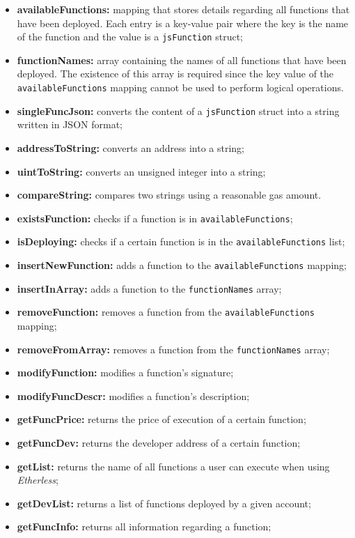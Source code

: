 	\begin{itemize}
		\item \textbf{availableFunctions:} mapping that stores details regarding all functions that have been deployed. Each entry is a key-value pair where the key is the name of the function and the value is a \texttt{jsFunction} struct;
		\item \textbf{functionNames:} array containing the names of all functions that have been deployed. The existence of this array is required since the key value of the \texttt{availableFunctions} mapping cannot be used to perform logical operations.
	\end{itemize}
	\begin{itemize}
		\item \textbf{singleFuncJson:} converts the content of a \texttt{jsFunction} struct into a string written in JSON format;
		\item \textbf{addressToString:} converts an address into a string;
		\item \textbf{uintToString:} converts an unsigned integer into a string;
		\item \textbf{compareString:} compares two strings using a reasonable gas amount.
		\item \textbf{existsFunction:} checks if a function is in \texttt{availableFunctions};
		\item \textbf{isDeploying:} checks if a certain function is in the \texttt{availableFunctions} list;
		\item \textbf{insertNewFunction:} adds a function to the \texttt{availableFunctions} mapping;
		\item \textbf{insertInArray:} adds a function to the \texttt{functionNames} array;
		\item \textbf{removeFunction:} removes a function from the \texttt{availableFunctions} mapping;
		\item \textbf{removeFromArray:} removes a function from the \texttt{functionNames} array;
		\item \textbf{modifyFunction:} modifies a function's signature;
		\item \textbf{modifyFuncDescr:} modifies a function's description;
		\item \textbf{getFuncPrice:} returns the price of execution of a certain function;
		\item \textbf{getFuncDev:} returns the developer address of a certain function;
		\item \textbf{getList:} returns the name of all functions a user can execute when using \textit{Etherless};
		\item \textbf{getDevList:} returns a list of functions deployed by a given account;
		\item \textbf{getFuncInfo:} returns all information regarding a function;
	\end{itemize}

